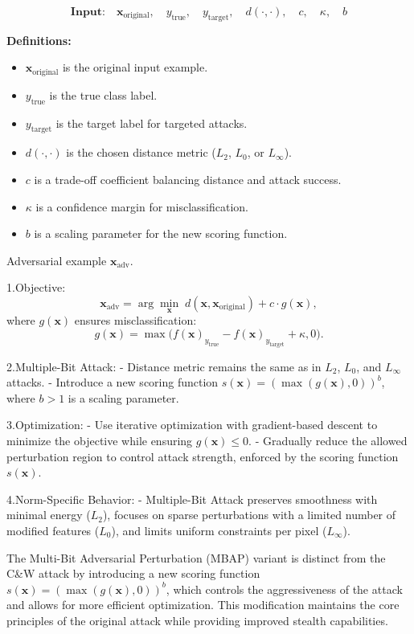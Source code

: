 \[
\textbf{Input:} \quad \mathbf{x}_{\text{original}}, \quad y_{\text{true}}, \quad y_{\text{target}}, \quad d(\cdot, \cdot), \quad c, \quad \kappa, \quad b
\]

\textbf{Definitions:}
\begin{itemize}
    \item \( \mathbf{x}_{\text{original}} \) is the original input example.
    \item \( y_{\text{true}} \) is the true class label.
    \item \( y_{\text{target}} \) is the target label for targeted attacks.
    \item \( d(\cdot, \cdot) \) is the chosen distance metric (\( L_2 \), \( L_0 \), or \( L_\infty \)).
    \item \( c \) is a trade-off coefficient balancing distance and attack success.
    \item \( \kappa \) is a confidence margin for misclassification.
    \item \( b \) is a scaling parameter for the new scoring function.
\end{itemize}


Adversarial example $\mathbf{x}_{\text{adv}}$.

1.Objective:
   \[
   \mathbf{x}_{\text{adv}} = \arg \min_{\mathbf{x}} \; d(\mathbf{x}, \mathbf{x}_{\text{original}}) + c \cdot g(\mathbf{x}),
   \]
   where $g(\mathbf{x})$ ensures misclassification:
   \[
   g(\mathbf{x}) = \max \big( f(\mathbf{x})_{y_{\text{true}}} - f(\mathbf{x})_{y_{\text{target}}} + \kappa, 0 \big).
   \]

2.Multiple-Bit Attack:
   - Distance metric remains the same as in $L_2$, $L_0$, and $L_\infty$ attacks.
   - Introduce a new scoring function $s(\mathbf{x}) = (\max(g(\mathbf{x}), 0))^b$, where $b > 1$ is a scaling parameter.

3.Optimization:
   - Use iterative optimization with gradient-based descent to minimize the objective while ensuring $g(\mathbf{x}) \leq 0$.
   - Gradually reduce the allowed perturbation region to control attack strength, enforced by the scoring function $s(\mathbf{x})$.

4.Norm-Specific Behavior:
   - Multiple-Bit Attack preserves smoothness with minimal energy ($L_2$), focuses on sparse perturbations with a limited number of modified features ($L_0$), and limits uniform constraints per pixel ($L_\infty$).

The Multi-Bit Adversarial Perturbation (MBAP) variant is distinct from the C\&W attack by introducing a new scoring function $s(\mathbf{x}) = (\max(g(\mathbf{x}), 0))^b$, which controls the aggressiveness of the attack and allows for more efficient optimization. This modification maintains the core principles of the original attack while providing improved stealth capabilities.